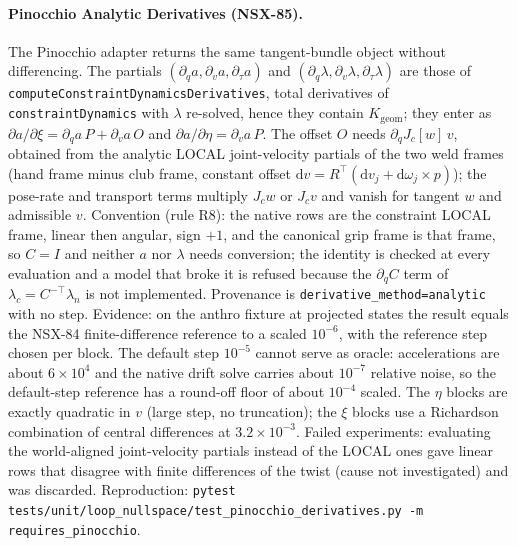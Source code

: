 \documentclass[11pt,a4paper]{article}
\begin{document}
\paragraph{Pinocchio Analytic Derivatives (NSX-85).}  The Pinocchio adapter
returns the same tangent-bundle object without differencing.  The partials
$(\partial_qa,\partial_va,\partial_\tau a)$ and
$(\partial_q\lambda,\partial_v\lambda,\partial_\tau\lambda)$ are those of
\texttt{computeConstraintDynamicsDerivatives}, total derivatives of
\texttt{constraintDynamics} with $\lambda$ re-solved, hence they contain
$K_{\mathrm{geom}}$; they enter as
$\partial a/\partial\xi=\partial_qa\,P+\partial_va\,O$ and
$\partial a/\partial\eta=\partial_va\,P$.  The offset $O$ needs
$\partial_qJ_c[w]\,v$, obtained from the analytic LOCAL joint-velocity partials
of the two weld frames (hand frame minus club frame, constant offset
$\mathrm{d}v=R^{\!\top}(\mathrm{d}v_j+\mathrm{d}\omega_j\times p)$); the pose-rate
and transport terms multiply $J_cw$ or $J_cv$ and vanish for tangent $w$ and
admissible $v$.  Convention (rule R8): the native rows are the constraint
LOCAL frame, linear then angular, sign $+1$, and the canonical grip frame is
that frame, so $C=I$ and neither $a$ nor $\lambda$ needs conversion; the identity
is checked at every evaluation and a model that broke it is refused because the
$\partial_qC$ term of $\lambda_c=C^{-\top}\lambda_n$ is not implemented.
Provenance is \texttt{derivative\_method=analytic} with no step.  Evidence: on
the anthro fixture at projected states the result equals the NSX-84
finite-difference reference to a scaled $10^{-6}$, with the reference step chosen
per block.  The default step $10^{-5}$ cannot serve as oracle: accelerations are
about $6\times10^{4}$ and the native drift solve carries about $10^{-7}$ relative
noise, so the default-step reference has a round-off floor of about
$10^{-4}$ scaled.  The $\eta$ blocks are exactly quadratic in $v$ (large
step, no truncation); the $\xi$ blocks use a Richardson combination of central
differences at $3.2\times10^{-3}$.  Failed experiments: evaluating the
world-aligned joint-velocity partials instead of the LOCAL ones gave linear
rows that disagree with finite differences of the twist (cause not
investigated) and was discarded.  Reproduction:
\texttt{pytest tests/unit/loop\_nullspace/test\_pinocchio\_derivatives.py -m requires\_pinocchio}.
\end{document}
